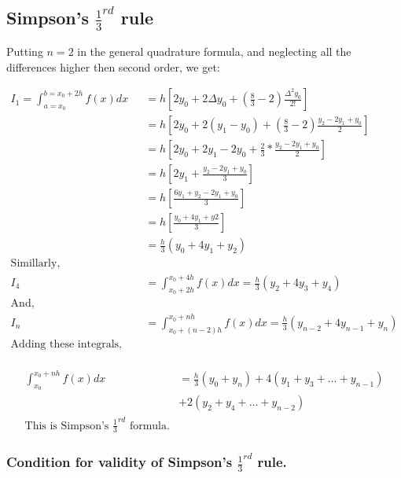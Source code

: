 \documentclass[10pt, twoside, a4paper]{article}
\begin{document}
\subsection{Simpson's $\frac{1}{3}^{rd}$ rule}%
Putting $n=2$ in the general quadrature formula, and neglecting all the
differences higher then second order, we get:

\begin{align*}
  I_1=\int_{a=x_0}^{b=x_0+2h}f(x)dx &= h[2y_0+2\Delta y_0
                                      +(\frac{8}{3}-2)\frac{\Delta^2y_0}{2!}]\\
                                    &= h[2y_0+2(y_1-y_0)+(\frac{8}{3}-2)
                                       \frac{y_2-2y_1+y_0}{2}]\\
                                    &= h[2y_0+2y_1-2y_0+\frac{2}{3}
                                      *\frac{y_2-2y_1+y_0}{2}]\\
                                    &= h[2y_1+\frac{y_2-2y_1+y_0}{3}]\\
                                    &= h[\frac{6y_1+y_2-2y_1+y_0}{3}]\\
                                    &= h[\frac{y_0+4y_1+y2}{3}]\\
                                    &= \frac{h}{3}(y_0+4y_1+y_2)\\
  \text{Simillarly,}\\
   I_4 &= \int_{x_0+2h}^{x_0+4h}f(x)dx = \frac{h}{3}(y_2+4y_3+y_4)\\
  \text{And,}\\
  I_n &= \int_{x_0+(n-2)h}^{x_0+nh}f(x)dx = \frac{h}{3}(y_{n-2}+4y_{n-1}+y_n)\\
  \text{Adding these integrals, we get}\\
\end{align*}
\begin{tcolorbox}
\begin{align*}
  \int_{x_0}^{x_0+nh}f(x)dx &= \frac{h}{3}(y_0+y_n)+4(y_1+y_3+
                               \dots+y_{n-1})\\
                            &+ 2(y_2+y_4+\dots+y_{n-2})\\
  \text{This is Simpson's $\frac{1}{3}^{rd}$ formula.}
\end{align*}
\end{tcolorbox}
\subsubsection{Condition for validity of Simpson's $\frac{1}{3}^{rd}$ rule.}
\end{document}
